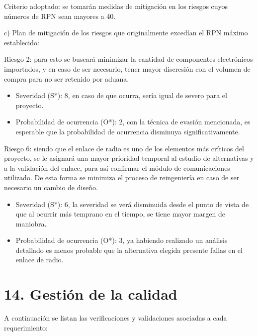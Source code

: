 \documentclass[
11pt, %
codirector, %
]{charter}
\begin{document}
Criterio adoptado: se tomarán medidas de mitigación en los riesgos cuyos números de RPN sean mayores a 40.

c) Plan de mitigación de los riesgos que originalmente excedían el RPN máximo establecido:
 
Riesgo 2: para esto se buscará minimizar la cantidad de componentes electrónicos importados, y en caso de ser necesario, tener mayor discresión con el volumen de compra para no ser retenido por aduana.
\begin{itemize}
\item Severidad (S*): 8, en caso de que ocurra, sería igual de severo para el proyecto.
\item Probabilidad de ocurrencia (O*): 2, con la técnica de evasión mencionada, es esperable que la probabilidad de ocurrencia disminuya significativamente.
\end{itemize}


Riesgo 6: siendo que el enlace de radio es uno de los elementos más críticos del proyecto, se le asignará una mayor prioridad temporal al estudio de alternativas y a la validación del enlace, para así confirmar el módulo de comunicaciones utilizado. De esta forma se minimiza el proceso de reingeniería en caso de ser necesario un cambio de diseño.

\begin{itemize}
\item Severidad (S*): 6, la severidad se verá disminuida desde el punto de vista de que al ocurrir más temprano en el tiempo, se tiene mayor margen de maniobra.
\item Probabilidad de ocurrencia (O*): 3, ya habiendo realizado un análisis detallado es menos probable que la alternativa elegida presente fallas en el enlace de radio.
\end{itemize}


\section{14. Gestión de la calidad}
\label{sec:calidad}

A continuación se listan las verificaciones y validaciones asociadas a cada requerimiento:
\end{document}
